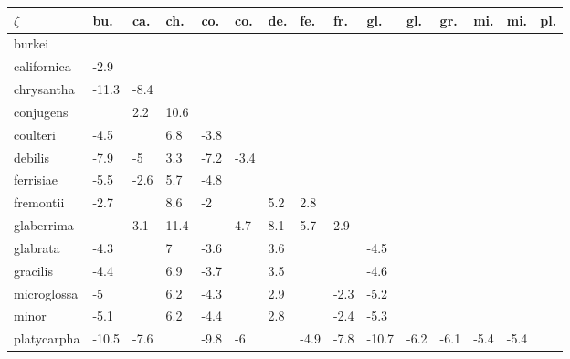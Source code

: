 \begin{table}[ht]
\centering
\begin{tabular}{lllllllllllllll}
  \hline
$\zeta$ & bu. & ca. & ch. & co. & co. & de. & fe. & fr. & gl. & gl. & gr. & mi. & mi. & pl. \\ 
  \hline
burkei &  &  &  &  &  &  &  &  &  &  &  &  &  &  \\ 
  californica & -2.9 &  &  &  &  &  &  &  &  &  &  &  &  &  \\ 
  chrysantha & -11.3 & -8.4 &  &  &  &  &  &  &  &  &  &  &  &  \\ 
  conjugens &  & 2.2 & 10.6 &  &  &  &  &  &  &  &  &  &  &  \\ 
  coulteri & -4.5 &  & 6.8 & -3.8 &  &  &  &  &  &  &  &  &  &  \\ 
  debilis & -7.9 & -5 & 3.3 & -7.2 & -3.4 &  &  &  &  &  &  &  &  &  \\ 
  ferrisiae & -5.5 & -2.6 & 5.7 & -4.8 &  &  &  &  &  &  &  &  &  &  \\ 
  fremontii & -2.7 &  & 8.6 & -2 &  & 5.2 & 2.8 &  &  &  &  &  &  &  \\ 
  glaberrima &  & 3.1 & 11.4 &  & 4.7 & 8.1 & 5.7 & 2.9 &  &  &  &  &  &  \\ 
  glabrata & -4.3 &  & 7 & -3.6 &  & 3.6 &  &  & -4.5 &  &  &  &  &  \\ 
  gracilis & -4.4 &  & 6.9 & -3.7 &  & 3.5 &  &  & -4.6 &  &  &  &  &  \\ 
  microglossa & -5 &  & 6.2 & -4.3 &  & 2.9 &  & -2.3 & -5.2 &  &  &  &  &  \\ 
  minor & -5.1 &  & 6.2 & -4.4 &  & 2.8 &  & -2.4 & -5.3 &  &  &  &  &  \\ 
  platycarpha & -10.5 & -7.6 &  & -9.8 & -6 &  & -4.9 & -7.8 & -10.7 & -6.2 & -6.1 & -5.4 & -5.4 &  \\ 
   \hline
\end{tabular}
\end{table}
